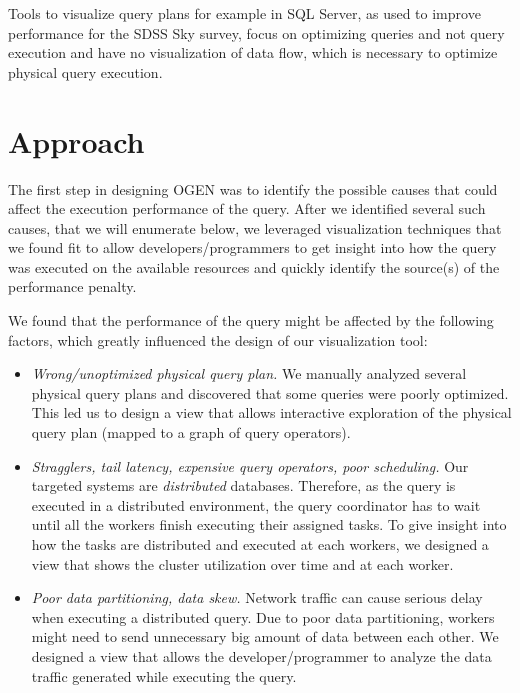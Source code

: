 \documentclass{chi2009}
\newcommand*{\system}{OGEN\xspace}
\begin{document}
Tools to visualize query plans for example in SQL Server, as used to improve performance for the SDSS Sky survey\cite{szalay2002sdss}, focus on optimizing queries and not query execution and have no visualization of data flow, which is necessary to optimize physical query execution.

\section{Approach}
\label{sec:approach}


The first step in designing \system was to identify the possible causes that
could affect the execution performance of the query. After we identified
several such causes, that we will enumerate below, we leveraged visualization
techniques that we found fit to allow developers/programmers to get insight
into how the query was executed on the available resources and quickly
identify the source(s) of the performance penalty.

We found that the performance of the query might be affected by the following
factors, which greatly influenced the design of our visualization tool:
\begin{itemize}
   \item \emph{Wrong/unoptimized physical query plan.} We manually analyzed
several physical query plans and discovered that some queries were poorly
optimized. This led us to design a view that allows interactive exploration of
the physical query plan (mapped to a graph of query operators). 
   \item \emph{Stragglers, tail latency, expensive query operators, poor
scheduling.} Our targeted systems are \emph{distributed} databases. Therefore,
as the query is executed in a distributed environment, the query coordinator
has to wait until all the workers finish executing their assigned tasks. To
give insight into how the tasks are distributed and executed at each workers,
we designed a view that shows the cluster utilization over time and at each
worker.
   \item \emph{Poor data partitioning, data skew.} Network traffic can cause
serious delay when executing a distributed query. Due to poor data
partitioning, workers might need to send unnecessary big amount of data between
each other. We designed a view that allows the developer/programmer to analyze
the data traffic generated while executing the query.  
\end{itemize} 
\end{document}
